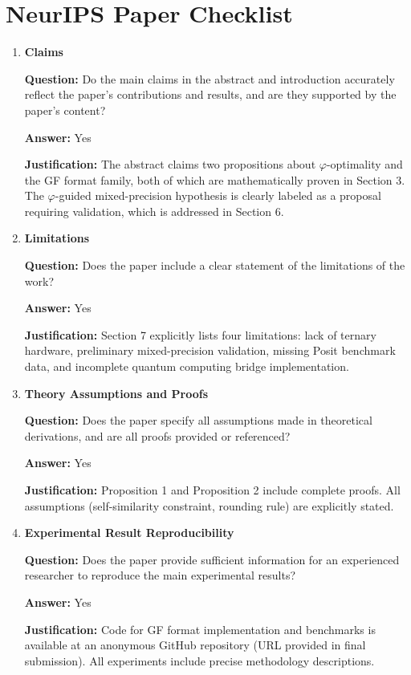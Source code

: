 \documentclass{article}
\begin{document}
\section*{NeurIPS Paper Checklist}

\begin{enumerate}
\item \textbf{Claims}

\textbf{Question:} Do the main claims in the abstract and introduction accurately reflect the paper's contributions and results, and are they supported by the paper's content?

\textbf{Answer:} Yes

\textbf{Justification:} The abstract claims two propositions about $\varphi$-optimality and the GF format family, both of which are mathematically proven in Section 3. The $\varphi$-guided mixed-precision hypothesis is clearly labeled as a proposal requiring validation, which is addressed in Section 6.

\item \textbf{Limitations}

\textbf{Question:} Does the paper include a clear statement of the limitations of the work?

\textbf{Answer:} Yes

\textbf{Justification:} Section 7 explicitly lists four limitations: lack of ternary hardware, preliminary mixed-precision validation, missing Posit benchmark data, and incomplete quantum computing bridge implementation.

\item \textbf{Theory Assumptions and Proofs}

\textbf{Question:} Does the paper specify all assumptions made in theoretical derivations, and are all proofs provided or referenced?

\textbf{Answer:} Yes

\textbf{Justification:} Proposition 1 and Proposition 2 include complete proofs. All assumptions (self-similarity constraint, rounding rule) are explicitly stated.

\item \textbf{Experimental Result Reproducibility}

\textbf{Question:} Does the paper provide sufficient information for an experienced researcher to reproduce the main experimental results?

\textbf{Answer:} Yes

\textbf{Justification:} Code for GF format implementation and benchmarks is available at an anonymous GitHub repository (URL provided in final submission). All experiments include precise methodology descriptions.


\end{enumerate}
\end{document}
